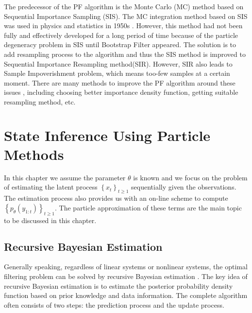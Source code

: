 \documentclass[mstat,12pt]{unswthesis}  %
\numberwithin{equation}{section}
\begin{document}
\noindent The predecessor of the PF algorithm is the Monte Carlo (MC) method based on Sequential Importance Sampling (SIS). 
The MC integration method based on SIS was used in physics and statistics in 1950s \cite{hammersley1954poor}.
However, this method had not been fully and effectively developed for a long period of time because of the particle degeneracy problem in SIS until Bootstrap Filter appeared.
The solution is to add resampling process to the algorithm and thus the SIS method is improved to Sequential Importance Resampling method(SIR).
However, SIR also leads to  Sample Impoverishment problem, which means too-few samples at a certain moment.
There are many methods to improve the PF algorithm around these issues , including 
choosing better importance density function, getting suitable resampling method, etc.






\chapter{State Inference Using Particle Methods}


\noindent In this chapter we assume the parameter $\theta$ is known
and we focus on the problem of estimating the latent
process $\left\{x_{t}\right\}_{t \geq 1}$ 
sequentially given the observations.
The estimation process also 
provides us with an on-line scheme to compute
 $\left\{p_{\theta}\left(y_{1:t}\right)\right\}_{t \geq 1}$.
The particle
approximation of these  terms are the main topic to be discussed
in this chapter.



\section{Recursive Bayesian Estimation}
\noindent Generally speaking, regardless of linear systems or nonlinear systems, the optimal filtering problem can be solved
by recursive Bayesian estimation \cite{ho1964bayesian}.
The key idea of recursive Bayesian estimation  is to 
estimate the posterior probability density function
based on prior knowledge and data information.
The complete algorithm often consists of two steps:
the prediction process and the update process.\\
\end{document}
